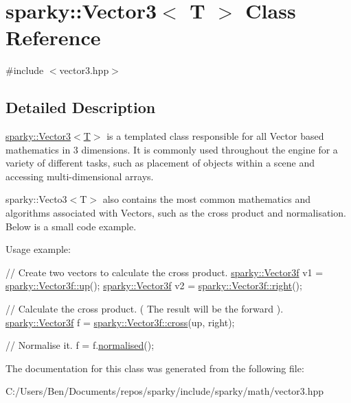 \hypertarget{classsparky_1_1_vector3_3_01_t_01_4}{}\section{sparky\+:\+:Vector3$<$ T $>$ Class Reference}
\label{classsparky_1_1_vector3_3_01_t_01_4}


{\ttfamily \#include $<$vector3.\+hpp$>$}



\subsection{Detailed Description}
\hyperlink{classsparky_1_1_vector3_3_01_t_01_4}{sparky\+::\+Vector3$<$\+T$>$} is a templated class responsible for all Vector based mathematics in 3 dimensions. It is commonly used throughout the engine for a variety of different tasks, such as placement of objects within a scene and accessing multi-\/dimensional arrays.

sparky\+::\+Vecto3$<$\+T$>$ also contains the most common mathematics and algorithms associated with Vectors, such as the cross product and normalisation. Below is a small code example.

Usage example\+: 
\begin{DoxyCode}
\textcolor{comment}{// Create two vectors to calculate the cross product.}
\hyperlink{classsparky_1_1_vector3}{sparky::Vector3f} v1 = \hyperlink{classsparky_1_1_vector3_af54c2e1458f00c76b06c61641c856c95}{sparky::Vector3f::up}();
\hyperlink{classsparky_1_1_vector3}{sparky::Vector3f} v2 = \hyperlink{classsparky_1_1_vector3_a5aa189b8cd595fdbe3fcbcfb03ad6f8e}{sparky::Vector3f::right}();

\textcolor{comment}{// Calculate the cross product. ( The result will be the forward ).}
\hyperlink{classsparky_1_1_vector3}{sparky::Vector3f} f = \hyperlink{classsparky_1_1_vector3_a707609704d1c3c85610f0ca069ec308c}{sparky::Vector3f::cross}(up, right);

\textcolor{comment}{// Normalise it.}
f = f.\hyperlink{classsparky_1_1_vector3_a1a19c4257d12e5e1178a6c75b905ea35}{normalised}();
\end{DoxyCode}
 

The documentation for this class was generated from the following file\+:\begin{DoxyCompactItemize}
\item 
C\+:/\+Users/\+Ben/\+Documents/repos/sparky/include/sparky/math/vector3.\+hpp\end{DoxyCompactItemize}

